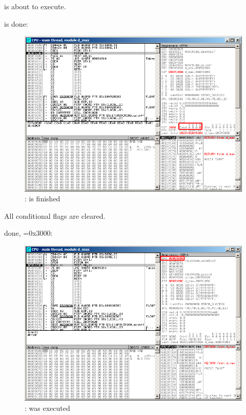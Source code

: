 \FCOM is about to execute.

\clearpage
\FCOM is done:

\begin{figure}[H]
\centering
\includegraphics[scale=\FigScale]{patterns/12_FPU/3_comparison/x86/MSVC_Ox/olly2_2.png}
\caption{\olly: \FCOM is finished}
\label{fig:FPU_comparison_Ox_case2_olly2}
\end{figure}

All conditional flags are cleared.

\clearpage
\FNSTSW done, =0x3000:

\begin{figure}[H]
\centering
\includegraphics[scale=\FigScale]{patterns/12_FPU/3_comparison/x86/MSVC_Ox/olly2_3.png}
\caption{\olly: \FNSTSW was executed}
\label{fig:FPU_comparison_Ox_case2_olly3}
\end{figure}

